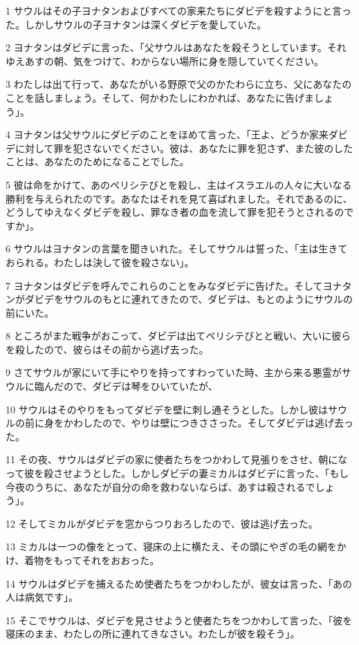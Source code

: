 \par 1 サウルはその子ヨナタンおよびすべての家来たちにダビデを殺すようにと言った。しかしサウルの子ヨナタンは深くダビデを愛していた。
\par 2 ヨナタンはダビデに言った、「父サウルはあなたを殺そうとしています。それゆえあすの朝、気をつけて、わからない場所に身を隠していてください。
\par 3 わたしは出て行って、あなたがいる野原で父のかたわらに立ち、父にあなたのことを話しましょう。そして、何かわたしにわかれば、あなたに告げましょう」。
\par 4 ヨナタンは父サウルにダビデのことをほめて言った、「王よ、どうか家来ダビデに対して罪を犯さないでください。彼は、あなたに罪を犯さず、また彼のしたことは、あなたのためになることでした。
\par 5 彼は命をかけて、あのペリシテびとを殺し、主はイスラエルの人々に大いなる勝利を与えられたのです。あなたはそれを見て喜ばれました。それであるのに、どうしてゆえなくダビデを殺し、罪なき者の血を流して罪を犯そうとされるのですか」。
\par 6 サウルはヨナタンの言葉を聞きいれた。そしてサウルは誓った、「主は生きておられる。わたしは決して彼を殺さない」。
\par 7 ヨナタンはダビデを呼んでこれらのことをみなダビデに告げた。そしてヨナタンがダビデをサウルのもとに連れてきたので、ダビデは、もとのようにサウルの前にいた。
\par 8 ところがまた戦争がおこって、ダビデは出てペリシテびとと戦い、大いに彼らを殺したので、彼らはその前から逃げ去った。
\par 9 さてサウルが家にいて手にやりを持ってすわっていた時、主から来る悪霊がサウルに臨んだので、ダビデは琴をひいていたが、
\par 10 サウルはそのやりをもってダビデを壁に刺し通そうとした。しかし彼はサウルの前に身をかわしたので、やりは壁につきささった。そしてダビデは逃げ去った。
\par 11 その夜、サウルはダビデの家に使者たちをつかわして見張りをさせ、朝になって彼を殺させようとした。しかしダビデの妻ミカルはダビデに言った、「もし今夜のうちに、あなたが自分の命を救わないならば、あすは殺されるでしょう」。
\par 12 そしてミカルがダビデを窓からつりおろしたので、彼は逃げ去った。
\par 13 ミカルは一つの像をとって、寝床の上に横たえ、その頭にやぎの毛の網をかけ、着物をもってそれをおおった。
\par 14 サウルはダビデを捕えるため使者たちをつかわしたが、彼女は言った、「あの人は病気です」。
\par 15 そこでサウルは、ダビデを見させようと使者たちをつかわして言った、「彼を寝床のまま、わたしの所に連れてきなさい。わたしが彼を殺そう」。
